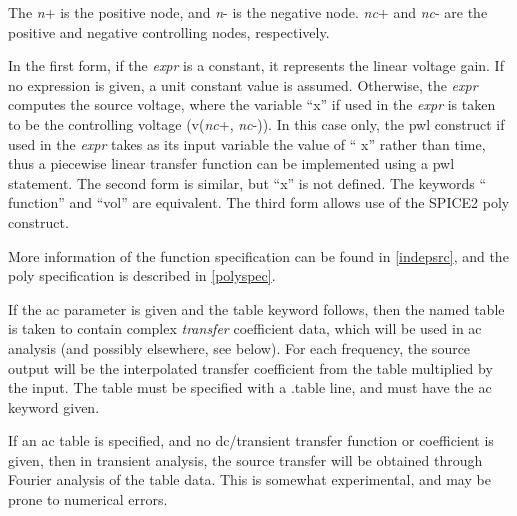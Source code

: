 
The {\it n\/}{\vt +} is the positive node, and {\it n\/}{\vt -} is the
negative node.  {\it nc\/}{\vt +} and {\it nc\/}{\vt -} are the
positive and negative controlling nodes, respectively.

In the first form, if the {\it expr} is a constant, it represents the
linear voltage gain.  If no expression is given, a unit constant
value is assumed.  Otherwise, the {\it expr} computes the source
voltage, where the variable ``{\vt x}'' if used in the {\it expr} is
taken to be the controlling voltage (v({\it nc\/}{\vt +},{\it
nc\/}{\vt -})).  In this case only, the {\vt pwl} construct if used
in the {\it expr} takes as its input variable the value of ``{\vt
x}'' rather than time, thus a piecewise linear transfer function can
be implemented using a {\vt pwl} statement.  The second form is
similar, but ``{\vt x}'' is not defined.  The keywords ``{\vt
function}'' and ``{\vt vol}'' are equivalent.  The third form allows
use of the SPICE2 {\vt poly} construct.

More information of the function specification can be found in
\ref{indepsrc}, and the {\vt poly} specification is described in
\ref{polyspec}.

If the {\vt ac} parameter is given and the {\vt table} keyword
follows, then the named table is taken to contain complex {\it
transfer} coefficient data, which will be used in ac analysis (and
possibly elsewhere, see below).  For each frequency, the source output
will be the interpolated transfer coefficient from the table
multiplied by the input.  The table must be specified with a {\vt
.table} line, and must have the {\vt ac} keyword given.

If an ac table is specified, and no dc/transient transfer function or
coefficient is given, then in transient analysis, the source transfer
will be obtained through Fourier analysis of the table data.  This is
somewhat experimental, and may be prone to numerical errors.

